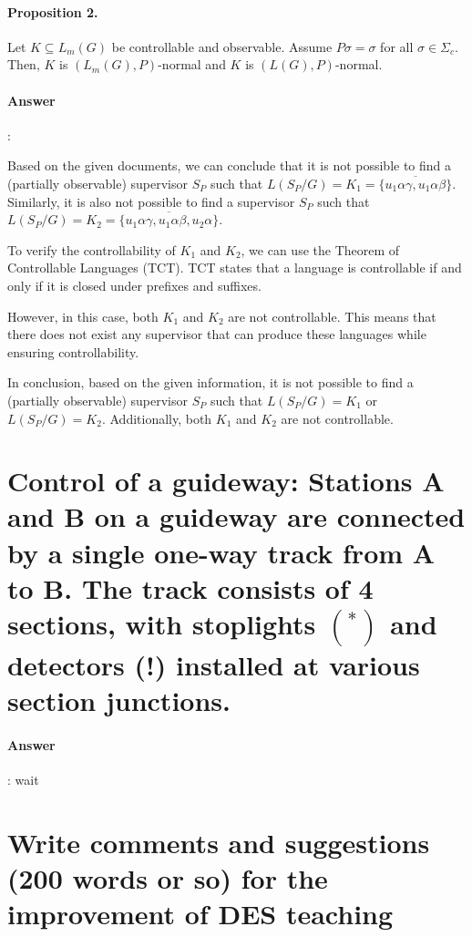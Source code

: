 \documentclass{article}
\begin{document}
\paragraph{Proposition 2.} Let $K \subseteq L_m(G)$ be controllable and observable. Assume $P \sigma=\sigma$ for all $\sigma \in \Sigma_c$. Then, $K$ is $\left(L_m(G), P\right)$-normal and $K$ is $(L(G), P)$-normal.

\paragraph{Answer}:

Based on the given documents, we can conclude that it is not possible to find a (partially observable) supervisor $S_P$ such that $L(S_P / G) = K_1=\overline{\{u_1 \alpha \gamma, u_1 \alpha \beta\}}$. Similarly, it is also not possible to find a supervisor $S_P$ such that $L(S_P / G) = K_2=\overline{\{u_1 \alpha \gamma, u_1 \alpha \beta, u_2 \alpha\}}$.

To verify the controllability of $K_1$ and $K_2$, we can use the Theorem of Controllable Languages (TCT). TCT states that a language is controllable if and only if it is closed under prefixes and suffixes. 

However, in this case, both $K_1$ and $K_2$ are not controllable. This means that there does not exist any supervisor that can produce these languages while ensuring controllability.

In conclusion, based on the given information, it is not possible to find a (partially observable) supervisor $S_P$ such that $L(S_P / G) = K_1$ or $L(S_P / G) = K_2$. Additionally, both $K_1$ and $K_2$ are not controllable.


\section{Control of a guideway: Stations A and B on a guideway are connected by a single one-way track from A to B. The track consists of 4 sections, with stoplights $\left({ }^*\right)$ and detectors (!) installed at various section junctions.}

\paragraph{Answer}:
wait

\section{Write comments and suggestions (200 words or so) for the improvement of DES teaching}
\end{document}
